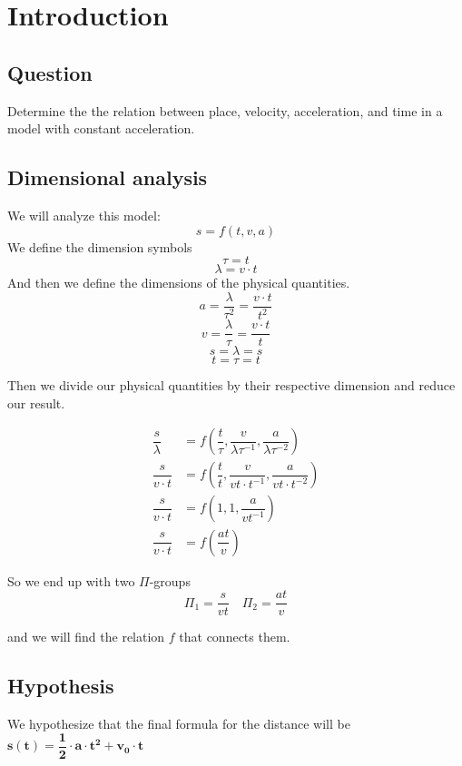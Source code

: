 \documentclass[main.tex]{subfiles}
\begin{document}
\section{Introduction}
\subsection{Question}
Determine the the relation between place, velocity, acceleration, and time in a model with constant acceleration.

\subsection{Dimensional analysis}
We will analyze this model:
$$
s=f(t,v,a)
$$
We define the dimension symbols
$$
\tau=t
$$
$$
\lambda=v\cdot t
$$
And then we define the dimensions of the physical quantities.
$$
a=\dfrac{\lambda}{\tau^2} = \dfrac{v\cdot t}{t^2}
$$
$$
v=\dfrac{\lambda}{\tau} = \dfrac{v\cdot t}{t}
$$
$$
s=\lambda=s
$$
$$
t=\tau=t
$$

Then we divide our physical quantities by their respective dimension and reduce our result.

\begin{align*}   
\dfrac{s}{\lambda}&=f\left(\dfrac{t}{\tau},\dfrac{v}{\lambda\tau^{-1}},\dfrac{a}{\lambda\tau^{-2}}\right)\\
\dfrac{s}{v\cdot t}&=f\left(\dfrac{t}{t},\dfrac{v}{vt\cdot t^{-1}},\dfrac{a}{vt\cdot t^{-2}}\right)\\
\dfrac{s}{v\cdot t}&=f\left(1,1,\dfrac{a}{vt^{-1}}\right)\\
\dfrac{s}{v\cdot t}&=f\left(\dfrac{at}{v}\right)
\end{align*}

So we end up with two $\Pi$-groups
$$
\Pi_1=\dfrac{s}{vt}\quad
\Pi_2=\dfrac{at}{v}
$$

and we will find the relation $f$ that connects them.





\subsection{Hypothesis}
We hypothesize that the final formula for the distance will be
$\mathbf{s(t) = \dfrac{1}{2} \cdot a \cdot t^2 + v_0 \cdot t}$
\end{document}

